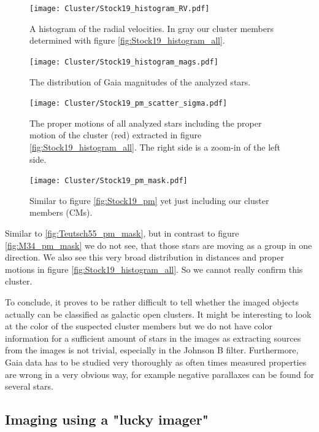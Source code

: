 \documentclass{article}
\begin{document}
\begin{figure}[H]
  \centering
    \texttt{[image: Cluster/Stock19\_histogram\_RV.pdf]}
  \caption{A histogram of the radial velocities. In gray our cluster members determined with figure \ref{fig:Stock19_histogram_all}.}
  \label{fig:Stock19_histogram_RV}
\end{figure}

\begin{figure}[H]
  \centering
    \texttt{[image: Cluster/Stock19\_histogram\_mags.pdf]}
  \caption{The distribution of Gaia magnitudes of the analyzed stars.}
  \label{fig:Stock19_histogram_mags}
\end{figure}

\begin{figure}[H]
  \centering
    \texttt{[image: Cluster/Stock19\_pm\_scatter\_sigma.pdf]}
  \caption{The proper motions of all analyzed stars including the proper motion of the cluster (red) extracted in figure \ref{fig:Stock19_histogram_all}. The right side is a zoom-in of the left side.}
  \label{fig:Stock19_pm_scatter_sigma}
\end{figure}

\begin{figure}[H]
  \centering
    \texttt{[image: Cluster/Stock19\_pm\_mask.pdf]}
  \caption{Similar to figure \ref{fig:Stock19_pm} yet just including our cluster members (CMs).}
  \label{fig:Stock19_pm_mask}
\end{figure}

Similar to \ref{fig:Teutsch55_pm_mask}, but in contrast to figure \ref{fig:M34_pm_mask} we do not see, that those stars are moving as a group in one direction. We also see this very broad distribution in distances and proper motions in figure \ref{fig:Stock19_histogram_all}. So we cannot really confirm this cluster.

To conclude, it proves to be rather difficult to tell whether the imaged objects actually can be classified as galactic open clusters. It might be interesting to look at the color of the suspected cluster members but we do not have color information for a sufficient amount of stars in the images as extracting sources from the images is not trivial, especially in the Johnson B filter. Furthermore, Gaia data has to be studied very thoroughly as often times measured properties are wrong in a very obvious way, for example negative parallaxes can be found for several stars.  

\subsection{Imaging using a "lucky imager"}
\end{document}

